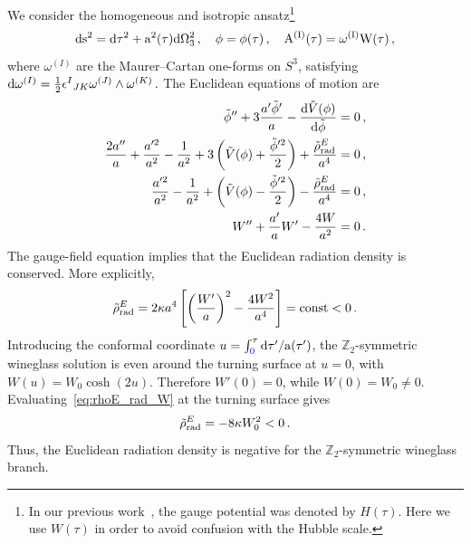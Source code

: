 \documentclass[a4paper,11pt]{article}
\begin{document}
We consider the homogeneous and isotropic ansatz\footnote{In our previous work~\cite{Betzios:2026rbv}, the gauge potential was denoted by $H(\tau)$. Here we use $W(\tau)$ in order to avoid confusion with the Hubble scale.}
\begin{equation}
    \rm{d}s^2 = \rm{d}\tau^2 + a^2(\tau) \rm{d}\Omega_3^2\,, \quad \phi = \phi(\tau)\,, \quad A^{(I)}(\tau) = \omega^{(I)} W(\tau)\,,
\end{equation}
where $\omega^{(I)}$ are the Maurer--Cartan one-forms on $S^3$, satisfying $ {\rm d}\omega^{(I)}=\frac{1}{2}\epsilon^{I}{}_{JK} \omega^{(J)}\wedge\omega^{(K)}\,.$
The Euclidean equations of motion are
\begin{align}
\tilde{\phi}''+3\frac{a'\tilde{\phi}'}{a}-\frac{{\rm d}\tilde{V}(\phi)}{{\rm d} \tilde{\phi}} &= 0\,, \nonumber
\\
\frac{2a''}{a}+\frac{a'^2}{a^2}-\frac{1}{a^2}  + 3 \left(\tilde{V}(\phi)+\frac{\tilde{\phi}'^2}{2} \right) +  \frac{\tilde{\rho}^E_{\rm rad}}{a^4} & =0  \,, \nonumber
\\
\frac{a'^2}{a^2} -\frac{1}{a^2}  + \left(\tilde{V}(\phi)-\frac{\tilde{\phi}'^2}{2} \right) - \frac{\tilde{\rho}^E_{\rm rad}}{a^4} & =0 \,, \nonumber
\\
W''+\frac{a'}{a}W'-\frac{4W}{a^2} &=0
\,.
\label{eq:eoms_Eucl}
\end{align}
The gauge-field equation implies that the Euclidean radiation density is conserved. More explicitly,
\begin{equation}
\tilde{\rho}^E_{\rm rad} = 2\kappa a^4 \left[ \left(\frac{W'}{a} \right)^2 - \frac{4W^2}{a^4} \right] = \rm const <0\,.
\label{eq:rhoE_rad_W}
\end{equation}
Introducing the conformal coordinate  $u = \int_{{\color{blue}0}}^{\tau} \rm{d}\tau'/a(\tau')$, the $\mathbb{Z}_2$-symmetric wineglass solution is even around the turning surface at $u=0$, with $W(u)=W_0\cosh(2u)$. Therefore $W'(0)=0$, while $W(0)=W_0\neq0$. Evaluating~\eqref{eq:rhoE_rad_W} at the turning surface gives
\begin{equation}
\tilde{\rho}^E_{\rm rad} = -8\kappa W_0^2<0 \,.
\end{equation}
Thus, the Euclidean radiation density is negative for the $\mathbb{Z}_2$-symmetric wineglass branch.
\end{document}
